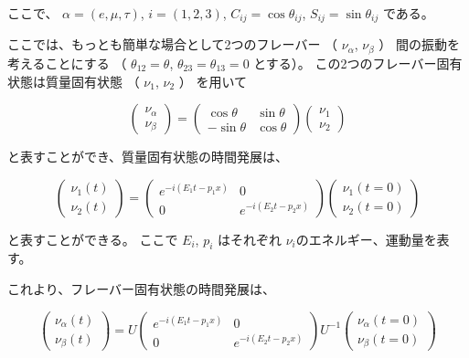 ここで、
$\alpha = (e, \mu, \tau)$,
$i = (1, 2, 3)$,
$C_{ij} = \cos \theta_{ij}$,
$S_{ij} = \sin \theta_{ij}$
である。

ここでは、もっとも簡単な場合として2つのフレーバー
（
$\nu_{\alpha}$,
$\nu_{\beta}$
）
間の振動を考えることにする
（
$\theta_{12} = \theta$,
$\theta_{23} = \theta_{13} = 0$
とする）。
この2つのフレーバー固有状態は質量固有状態
（
$\nu_{1}$,
$\nu_{2}$
）
を用いて

\begin{equation}
    \begin{pmatrix}
        \nu_{\alpha}\\
        \nu_{\beta}
    \end{pmatrix}
    =
    \begin{pmatrix}
        \cos\theta & \sin\theta\\
        -\sin\theta & \cos\theta
    \end{pmatrix}
    \begin{pmatrix}
        \nu_{1}\\
        \nu_{2}
    \end{pmatrix}
\end{equation}

と表すことができ、質量固有状態の時間発展は、


\begin{equation}
    \begin{pmatrix}
        \nu_{1}(t)\\
        \nu_{2}(t)
    \end{pmatrix}
    =
    \begin{pmatrix}
        e^{-i(E_{1}t-p_{1}x)} & 0\\
        0 & e^{-i(E_{2}t-p_{2}x)}
    \end{pmatrix}
    \begin{pmatrix}
        \nu_{1}(t=0)\\
        \nu_{2}(t=0)
    \end{pmatrix}
\end{equation}

と表すことができる。
ここで
$E_{i}$,
$p_{i}$
はそれぞれ
$\nu_{i}$のエネルギー、運動量を表す。

これより、フレーバー固有状態の時間発展は、

\begin{equation}
    \begin{pmatrix}
        \nu_{\alpha}(t)\\
        \nu_{\beta}(t)
    \end{pmatrix}
    = U
    \begin{pmatrix}
        e^{-i(E_{1}t-p_{1}x)} & 0\\
        0 & e^{-i(E_{2}t-p_{2}x)}
    \end{pmatrix}
    U^{-1}
    \begin{pmatrix}
        \nu_{\alpha}(t=0)\\
        \nu_{\beta}(t=0) \label{equA}
    \end{pmatrix}
\end{equation}

